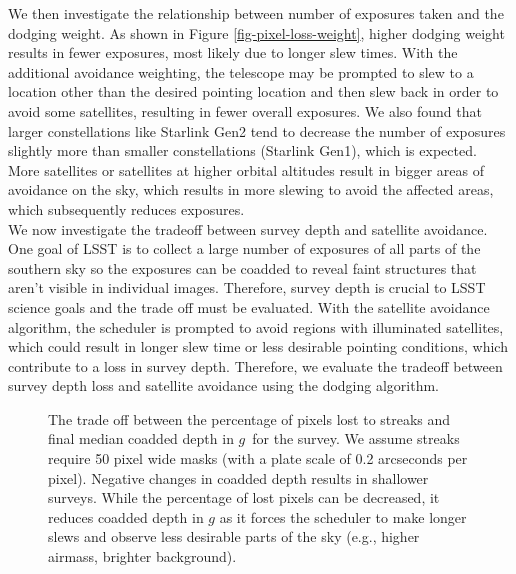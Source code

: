 \documentclass[linenumbers]{aastex631}
\begin{document}
We then investigate the relationship between number of exposures taken and the dodging weight. As shown in Figure \ref{fig-pixel-loss-weight}, higher dodging weight results in fewer exposures, most likely due to longer slew times. With the additional avoidance weighting, the telescope may be prompted to slew to a location other than the desired pointing location and then slew back in order to avoid some satellites, resulting in fewer overall exposures. We also found that larger constellations like Starlink Gen2 tend to decrease the number of exposures slightly more than smaller constellations (Starlink Gen1), which is expected. More satellites or satellites at higher orbital altitudes result in bigger areas of avoidance on the sky, which results in more slewing to avoid the affected areas, which subsequently reduces exposures. \\

We now investigate the tradeoff between survey depth and satellite avoidance. One goal of LSST is to collect a large number of exposures of all parts of the southern sky so the exposures can be coadded to reveal faint structures that aren’t visible in individual images. Therefore, survey depth is crucial to LSST science goals and the trade off must be evaluated. With the satellite avoidance algorithm, the scheduler is prompted to avoid regions with illuminated satellites, which could result in longer slew time or less desirable pointing conditions, which contribute to a loss in survey depth. Therefore, we evaluate the tradeoff between survey depth loss and satellite avoidance using the dodging algorithm.\\

\begin{figure}[ht!]
\caption{The trade off between the percentage of pixels lost to streaks and final median coadded depth in $g$\ for the survey. We assume streaks require 50 pixel wide masks (with a plate scale of 0.2 arcseconds per pixel).  Negative changes in coadded depth results in shallower surveys. While the percentage of lost pixels can be decreased, it reduces coadded depth in $g$ as it forces the scheduler to make longer slews and observe less desirable parts of the sky (e.g., higher airmass, brighter background). \label{fig-trade-off}}
\end{figure}
\end{document}
